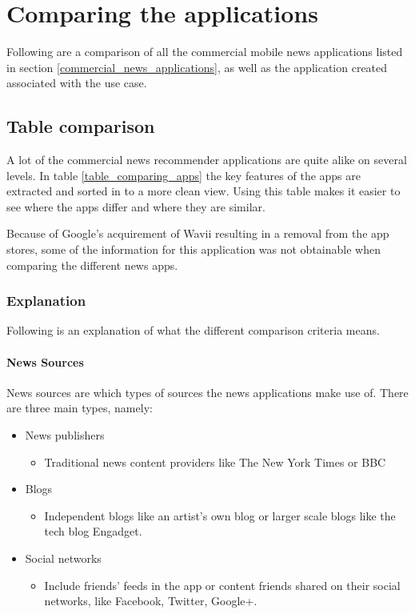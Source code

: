 \chapter{Comparing the applications}
Following are a comparison of all the commercial mobile news applications listed in section \ref{commercial_news_applications}, as well as the application created associated with the use case.


\section{Table comparison}
A lot of the commercial news recommender applications are quite alike on several levels. In table \ref{table_comparing_apps} the key features of the apps are extracted and sorted in to a more clean view. Using this table makes it easier to see where the apps differ and where they are similar. 

Because of Google's acquirement of Wavii resulting in a removal from the app stores, some of the information for this application was not obtainable when comparing the different news apps.

\subsection{Explanation}
Following is an explanation of what the different comparison criteria means.

\subsubsection{News Sources}
News sources are which types of sources the news applications make use of. There are three main types, namely:

\begin{itemize}
	\item News publishers
	\begin{itemize}
		\item Traditional news content providers like The New York Times or BBC
	\end{itemize}

	\item Blogs
	\begin{itemize}
		\item Independent blogs like an artist's own blog or larger scale blogs like the tech blog Engadget.
	\end{itemize}

	\item Social networks
	\begin{itemize}
		\item Include friends' feeds in the app or content friends shared on their social networks, like Facebook, Twitter, Google+.
	\end{itemize}
\end{itemize}

